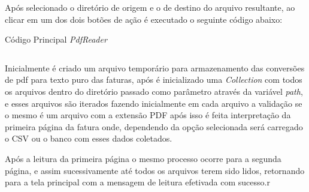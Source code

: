 Após selecionado o diretório de origem e o de destino do arquivo resultante, ao clicar em um dos dois botões de ação é executado o seguinte código abaixo:

\begin{listing}[ht]

\label{listing:sidesynchronizer}
\caption{Código Principal \textit{PdfReader}}
\inputminted[frame=lines,
    firstline=26,
    lastline=52,
    framesep=5mm, fontsize=\footnotesize, linenos=true, label={App.java}]{java}{codigos/PdfReader/App.java}
\end{listing}

Inicialmente é criado um arquivo temporário para armazenamento das conversões de pdf para texto puro das faturas, após é inicializado uma \textit{Collection} com todos os arquivos dentro do diretório passado como parâmetro através da variável \textit{path}, e esses arquivos são iterados fazendo inicialmente em cada arquivo a validação se o mesmo é um arquivo com a extensão PDF após isso é feita interpretação da primeira página da fatura onde, dependendo da opção selecionada será carregado o CSV ou o banco com esses dados coletados.

Após a leitura da primeira página o mesmo processo ocorre para a segunda página, e assim sucessivamente até todos os arquivos terem sido lidos, retornando para a tela principal com a mensagem de leitura efetivada com sucesso.r
